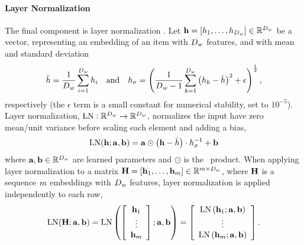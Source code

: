  \paragraph{Layer Normalization}
The final component is layer normalization
 \citep{ba2016}.
 Let $\mathbf{h} = \left[h_1,\ldots,h_{D_{w}}\right] \in \mathbb{R}^{{D_{w}}}$ be a vector, representing
 an embedding of an item with ${D_{w}}$ features, and with mean and standard deviation
\[\bar{h}= \frac{1}{{D_{w}}} \sum_{i=1}^{D_{w}} h_i
    \quad \textrm{and} \quad
  h_\sigma = \left(
      \frac{1}{{D_{w}}-1} \sum_{k=1}^{D_{w}} \left( 
  h_k - \bar{h} \right)^2  + \epsilon\right)^\frac{1}{2},\]
  respectively 
  (the $\epsilon$ term is a small constant for numerical stability,
  set to $10^{-5}$).
Layer normalization, 
$\operatorname{LN} : \mathbb{R}^{{D_{w}}} \rightarrow \mathbb{R}^{{D_{w}}}$,
normalizes the input have zero mean/unit variance before scaling each element
and adding a bias,
\[\operatorname{LN}(\mathbf{h}; \mathbf{a}, \mathbf{b}) = \mathbf{a} \odot \left(\mathbf{h} - \bar{h}\right) \cdot h_\sigma^{-1} + \mathbf{b} \]
where $\mathbf{a}, \mathbf{b} \in \mathbb{R}^{{D_{w}}}$ are learned parameters
and $\odot$ is the \elementwise~product.
When applying layer normalization to a matrix $\mathbf{H} =\left[\mathbf{h}_1,\ldots,\mathbf{h}_{m} \right]\in \mathbb{R}^{m \times {D_{\ensuremath{w}}}}$, where $\mathbf{H}$ is a sequence $m$ embeddings
with ${D_{w}}$ features, layer normalization is applied independently to 
each row,
\[ \operatorname{LN}(\mathbf{H};\mathbf{a}, \mathbf{b}) = \operatorname{LN}\left( \left[ \begin{array}{c}\mathbf{h}_1 \\ \vdots \\ \mathbf{h}_{m}  \end{array} \right]; \mathbf{a}, \mathbf{b}\right) =  \left[ \begin{array}{c} \operatorname{LN}\left( \mathbf{h}_1;\mathbf{a},\mathbf{b}\right) \\ \vdots \\ \operatorname{LN}\left( \mathbf{h}_{m};\mathbf{a},\mathbf{b}\right)  \end{array} \right].  \]





